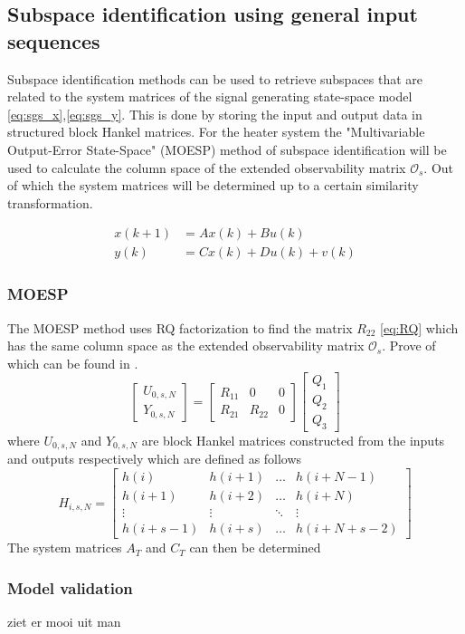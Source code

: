 \subsection{Subspace identification using general input sequences}
Subspace identification methods can be used to retrieve subspaces that are related to the system matrices of the signal generating state-space model \ref{eq:sgs_x},\ref{eq:sgs_y}. This is done by storing the input and output data in structured block Hankel matrices. For the heater system the "Multivariable Output-Error State-Space" (MOESP) method \cite[p.~301--312]{FilteringIdentification} of subspace identification will be used to calculate the column space of the extended observability matrix $\mathcal{O}_s$. Out of which the system matrices will be determined up to a certain similarity transformation. 

\begin{align}
    x(k+1) &= Ax(k) + Bu(k) \label{eq:sgs_x}\\
    y(k) &= Cx(k) + Du(k) + v(k) \label{eq:sgs_y}
\end{align}

\subsubsection{MOESP}
The MOESP method uses RQ factorization to find the matrix $R_{22}$ \ref{eq:RQ} which has the same column space as the extended observability matrix $\mathcal{O}_s$. Prove of which can be found in \cite[p.~304--305]{FilteringIdentification}.
\begin{equation}
    \left[\begin{array}{c}
        U_{0, s, N} \\
        Y_{0, s, N}
    \end{array}\right]=\left[\begin{array}{ccc}
        R_{11} & 0 & 0 \\
        R_{21} & R_{22} & 0
    \end{array}\right]\left[\begin{array}{c}
        Q_{1} \\
        Q_{2} \\
        Q_{3}
    \end{array}\right]
    \label{eq:RQ}
\end{equation}
where $U_{0,s,N}$ and $Y_{0,s,N}$ are block Hankel matrices constructed from the inputs and outputs respectively which are defined as follows
$$
H_{i, s, N}=\left[\begin{array}{cccc}
h(i) & h(i+1) & \dots & h(i+N-1) \\
h(i+1) & h(i+2) & \dots & h(i+N) \\
\vdots & \vdots & \ddots & \vdots \\
h(i+s-1) & h(i+s) & \dots & h(i+N+s-2)
\end{array}\right]
$$
The system matrices $A_T$ and $C_T$ can then be determined 

\subsubsection{Model validation}
ziet er mooi uit man